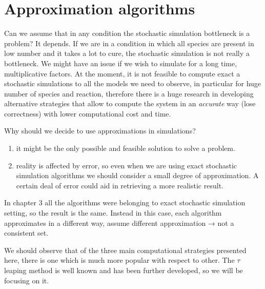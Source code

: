 \graphicspath{{chapters/04/}}
\chapter{Approximation algorithms}

Can we assume that in any condition the stochastic simulation bottleneck
is a problem? It depends. If we are in a condition in which all species
are present in low number and it takes a lot to cure, the stochastic
simulation is not really a bottleneck. We might have an issue if we wish
to simulate for a long time, multiplicative factors. At the moment, it
is not feasible to compute exact a stochastic simulations to all the
models we need to observe, in particular for huge number of species and
reaction, therefore there is a huge research in developing alternative
strategies that allow to compute the system in an \emph{accurate} way
(lose correctness) with lower computational cost and time.

Why should we decide to use approximations in simulations?

\begin{enumerate}
\def\labelenumi{\arabic{enumi}.}
\tightlist
\item
  it might be the only possible and feasible solution to solve a
  problem.
\item
  reality is affected by error, so even when we are using exact
  stochastic simulation algorithms we should consider a small degree of
  approximation. A certain deal of error could aid in retrieving a more
  realistic result.
\end{enumerate}

In chapter 3 all the algorithms were belonging to exact stochastic
simulation setting, so the result is the same. Instead in this case,
each algorithm approximates in a different way, assume different
approximation → not a consistent set.

We should observe that of the three main computational strategies
presented here, there is one which is much more popular with respect to
other. The $\tau$ leaping method is well known and has been further
developed, so we will be focusing on it.

